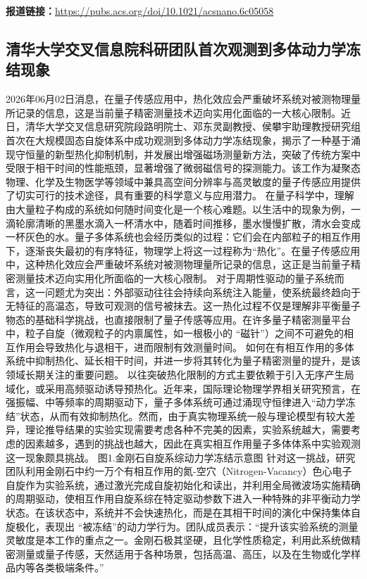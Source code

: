 \documentclass[12pt,a4paper]{ctexart}
\begin{document}
\noindent\textbf{报道链接：}\url{https://pubs.acs.org/doi/10.1021/acsnano.6c05058}

\subsection{ 清华大学交叉信息院科研团队首次观测到多体动力学冻结现象 }

2026年06月02日消息，在量子传感应用中，热化效应会严重破坏系统对被测物理量所记录的信息，这是当前量子精密测量技术迈向实用化面临的一大核心限制。近日，清华大学交叉信息研究院段路明院士、邓东灵副教授、侯攀宇助理教授研究组首次在大规模固态自旋体系中成功观测到多体动力学冻结现象，揭示了一种基于涌现守恒量的新型热化抑制机制，并发展出增强磁场测量新方法，突破了传统方案中受限于相干时间的性能瓶颈，显著增强了微弱磁信号的探测能力。该工作为凝聚态物理、化学及生物医学等领域中兼具高空间分辨率与高灵敏度的量子传感应用提供了切实可行的技术途径，具有重要的科学意义与应用潜力。
在量子科学中，理解由大量粒子构成的系统如何随时间变化是一个核心难题。以生活中的现象为例，一滴轮廓清晰的黑墨水滴入一杯清水中，随着时间推移，墨水慢慢扩散，清水会变成一杯灰色的水。量子多体系统也会经历类似的过程：它们会在内部粒子的相互作用下，逐渐丧失最初的有序特征，物理学上将这一过程称为“热化”。在量子传感应用中，这种热化效应会严重破坏系统对被测物理量所记录的信息，这正是当前量子精密测量技术迈向实用化所面临的一大核心限制。
对于周期性驱动的量子系统而言，这一问题尤为突出：外部驱动往往会持续向系统注入能量，使系统最终趋向于无特征的高温态，导致可观测的信号被抹去。这一热化过程不仅是理解非平衡量子物态的基础科学挑战，也直接限制了量子传感等应用。在许多量子精密测量平台中，粒子自旋（微观粒子的内禀属性，如一根极小的 “磁针”）之间不可避免的相互作用会导致热化与退相干，进而限制有效测量时间。
如何在有相互作用的多体系统中抑制热化、延长相干时间，并进一步将其转化为量子精密测量的提升，是该领域长期关注的重要问题。
以往突破热化限制的方式主要依赖于引入无序产生局域化，或采用高频驱动诱导预热化。近年来，国际理论物理学界相关研究预言，在强振幅、中等频率的周期驱动下，量子多体系统可通过涌现守恒律进入“动力学冻结”状态，从而有效抑制热化。然而，由于真实物理系统一般与理论模型有较大差异，理论推导结果的实验实现需要考虑各种不完美的因素，实验系统越大，需要考虑的因素越多，遇到的挑战也越大，因此在真实相互作用量子多体体系中实验观测这一现象颇具挑战。
图1.金刚石自旋系综动力学冻结示意图
针对这一挑战，研究团队利用金刚石中约一万个有相互作用的氮-空穴（Nitrogen-Vacancy）色心电子自旋作为实验系统，通过激光完成自旋初始化和读出，并利用全局微波场实施精确的周期驱动，使相互作用自旋系综在特定驱动参数下进入一种特殊的非平衡动力学状态。在该状态中，系统并不会快速热化，而是在其相干时间的演化中保持集体自旋极化，表现出 “被冻结”的动力学行为。团队成员表示：“提升该实验系统的测量灵敏度是本工作的重点之一。金刚石极其坚硬，且化学性质稳定，利用此系统做精密测量或量子传感，天然适用于各种场景，包括高温、高压，以及在生物或化学样品内等各类极端条件。”
\end{document}
